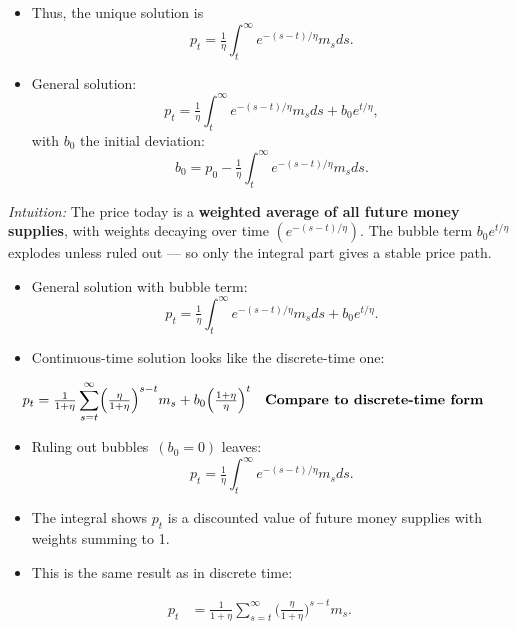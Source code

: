 \documentclass[12pt]{article}
\begin{document}
\begin{itemize}
    \item Thus, the unique solution is
    \[
      p_t = \tfrac{1}{\eta}\int_t^\infty e^{-(s-t)/\eta} m_s ds .
    \]
    \item General solution:
    \[
      p_t = \tfrac{1}{\eta}\int_t^\infty e^{-(s-t)/\eta} m_s ds + b_0 e^{t/\eta},
    \]
    with \(b_0\) the initial deviation:
    \[
      b_0 = p_0 - \tfrac{1}{\eta}\int_t^\infty e^{-(s-t)/\eta} m_s ds.
    \]
\end{itemize}

\textit{Intuition:} The price today is a \textbf{weighted average of all future money supplies}, with weights decaying over time \((e^{-(s-t)/\eta})\).  
The bubble term \(b_0 e^{t/\eta}\) explodes unless ruled out — so only the integral part gives a stable price path.

\begin{itemize}
    \item General solution with bubble term:
    \[
      p_t = \tfrac{1}{\eta}\int_t^\infty e^{-(s-t)/\eta} m_s ds + b_0 e^{t/\eta}.
    \]
    \item Continuous-time solution looks like the discrete-time one:
\end{itemize}

\singlespacing
\begin{align}
p_t &= \tfrac{1}{1+\eta}\sum_{s=t}^\infty\!\Big(\tfrac{\eta}{1+\eta}\Big)^{s-t} m_s 
      + b_0 \Big(\tfrac{1+\eta}{\eta}\Big)^t && \text{\textbf{Compare to discrete-time form}}
\end{align}

\begin{itemize}
    \item Ruling out bubbles $\,(b_0=0)$ leaves:
    \[
      p_t = \tfrac{1}{\eta}\int_t^\infty e^{-(s-t)/\eta} m_s ds.
    \]
    \item The integral shows $p_t$ is a discounted value of future money supplies with weights summing to 1.  
    \item This is the same result as in discrete time:
\end{itemize}

\singlespacing
\begin{align}
p_t &= \tfrac{1}{1+\eta}\sum_{s=t}^\infty \Big(\tfrac{\eta}{1+\eta}\Big)^{s-t} m_s .
\end{align}
\end{document}
